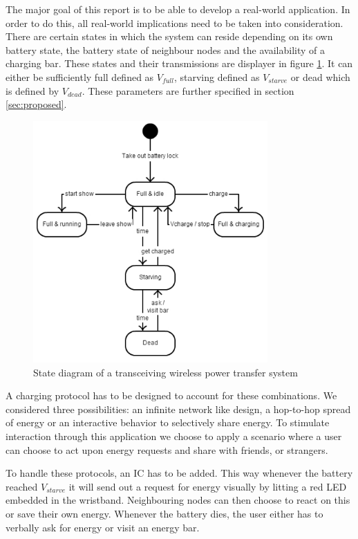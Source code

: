 The major goal of this report is to be able to develop a real-world application. In order to do this, all real-world implications need to be taken into consideration. There are certain states in which the system can reside depending on its own battery state, the battery state of neighbour nodes and the availability of a charging bar. These states and their transmissions are displayer in figure \ref{fig:states}. It can either be sufficiently full defined as $V_{full}$, starving defined as $V_{starve}$ or dead which is defined by $V_{dead}$. These parameters are further specified in section \ref{sec:proposed}.

\begin{figure}[h!]
\centering
\includegraphics[width=0.8\textwidth]{statediagram.pdf}
\caption{State diagram of a transceiving wireless power transfer system}
\label{fig:states}
\end{figure}

A charging protocol has to be designed to account for these combinations. We considered three possibilities: an infinite network like design, a hop-to-hop spread of energy or an interactive behavior to selectively share energy. To stimulate interaction through this application we choose to apply a scenario where a user can choose to act upon energy requests and share with friends, or strangers.

To handle these protocols, an IC has to be added. This way whenever the battery reached $V_{starve}$ it will send out a request for energy visually by litting a red LED embedded in the wristband. Neighbouring nodes can then choose to react on this or save their own energy. Whenever the battery dies, the user either has to verbally ask for energy or visit an energy bar.
